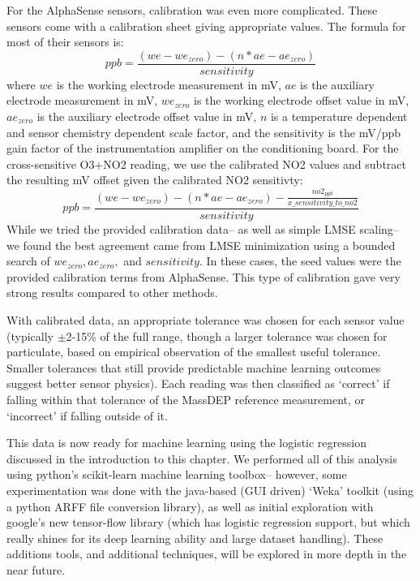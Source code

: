 For the AlphaSense sensors, calibration was even more complicated.  These sensors come with a calibration sheet giving appropriate values.  The formula for most of their sensors is: {\small \[ppb = \frac{(we - we_{zero}) - (n*ae - ae_{zero})}{sensitivity}\]} where $we$ is the working electrode measurement in mV, $ae$ is the auxiliary electrode measurement in mV, $we_{zero}$ is the working electrode offset value in mV, $ae_{zero}$ is the auxiliary electrode offset value in mV, $n$ is a temperature dependent and sensor chemistry dependent scale factor, and the sensitivity is the mV/ppb gain factor of the instrumentation amplifier on the conditioning board.  For the cross-sensitive O3+NO2 reading, we use the calibrated NO2 values and subtract the resulting mV offset given the calibrated NO2 sensitivty: {\small \[ppb = \frac{(we - we_{zero}) - (n*ae - ae_{zero}) - \frac{no2_{ppb}}{x\_sensitivity\_to\_no2}}{sensitivity}\]} While we tried the provided calibration data-- as well as simple LMSE scaling-- we found the best agreement came from LMSE minimization using a bounded search of $we_{zero},  ae_{zero},$ and $sensitivity$.  In these cases, the seed values were the provided calibration terms from AlphaSense.  This type of calibration gave very strong results compared to other methods.

With calibrated data, an appropriate tolerance was chosen for each sensor value (typically $\pm$2-15\% of the full range, though a larger tolerance was chosen for particulate, based on empirical observation of the smallest useful tolerance.  Smaller tolerances that still provide predictable machine learning outcomes suggest better sensor physics).  Each reading was then classified as `correct' if falling within that tolerance of the MassDEP reference measurement, or `incorrect' if falling outside of it. 

This data is now ready for machine learning using the logistic regression discussed in the introduction to this chapter.  We performed all of this analysis using python's scikit-learn machine learning toolbox-- however, some experimentation was done with the java-based (GUI driven) `Weka' toolkit (using a python ARFF file conversion library), as well as initial exploration with google's new tensor-flow library (which has logistic regression support, but which really shines for its deep learning ability and large dataset handling).  These additions tools, and additional techniques, will be explored in more depth in the near future.

